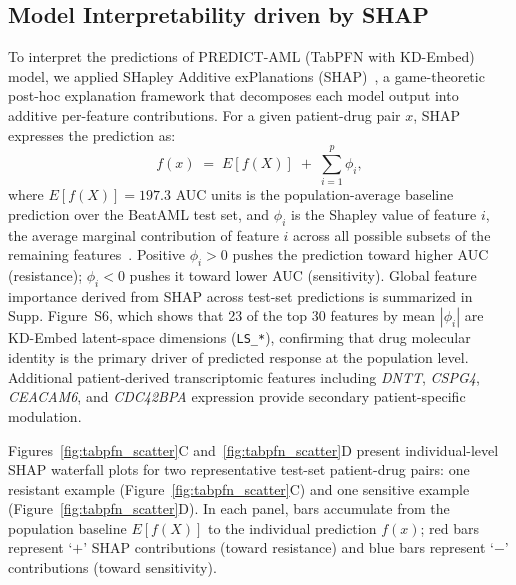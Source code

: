 \documentclass[pdflatex,sn-mathphys-num]{sn-jnl}
\theoremstyle{thmstyleone}
\theoremstyle{thmstyletwo}
\theoremstyle{thmstylethree}
\begin{document}
\subsection{Model Interpretability driven by SHAP}\label{sec3.3}
To interpret the predictions of PREDICT-AML (TabPFN with KD-Embed) model, we applied SHapley Additive exPlanations (SHAP)~\cite{lundberg2017unified}, a game-theoretic post-hoc explanation framework that decomposes each model output into additive per-feature contributions. For a given patient-drug pair $x$, SHAP expresses the prediction as:
\begin{equation}
    f(x) \;=\; E[f(X)] \;+\; \sum_{i=1}^{p} \phi_i,
    \label{eq:shap}
\end{equation}
where $E[f(X)] = 197.3$ AUC units is the population-average baseline prediction over the BeatAML test set, and $\phi_i$ is the Shapley value of feature $i$, the average marginal contribution of feature $i$ across all possible subsets of the remaining features~\cite{shapley1953stochastic}. Positive $\phi_i > 0$ pushes the prediction toward higher AUC (resistance); $\phi_i < 0$ pushes it toward lower AUC (sensitivity). Global feature importance derived from SHAP across test-set predictions is summarized in Supp. Figure~S6, which shows that 23 of the top 30 features by mean $|\phi_i|$ are KD-Embed latent-space dimensions (\texttt{LS\_*}), confirming that drug molecular identity is the primary driver of predicted response at the population level. Additional patient-derived transcriptomic features including \textit{DNTT}, \textit{CSPG4}, \textit{CEACAM6}, and \textit{CDC42BPA} expression provide secondary patient-specific modulation.

Figures~\ref{fig:tabpfn_scatter}C and~\ref{fig:tabpfn_scatter}D present individual-level SHAP waterfall plots for two representative test-set patient-drug pairs: one resistant example (Figure~\ref{fig:tabpfn_scatter}C) and one sensitive example (Figure~\ref{fig:tabpfn_scatter}D). In each panel, bars accumulate from the population baseline $E[f(X)]$ to the individual prediction $f(x)$; red bars represent `$+$' SHAP contributions (toward resistance) and blue bars represent `$-$' contributions (toward sensitivity).

\end{document}
